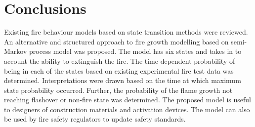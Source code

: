 \documentclass[12pt]{asme2ej}
\begin{document}
\section{Conclusions}
Existing fire behaviour models based on state transition methods were reviewed. An alternative and structured approach to fire growth modelling based on semi-Markov process model was proposed. The model has six states and takes in to account the ability to extinguish the fire.  The time dependent probability of being in each of the states based on existing experimental fire test data was determined. Interpretations were drawn based on the time at which maximum state probability occurred.  Further, the probability of the flame growth not reaching flashover or non-fire state was determined. The proposed model is useful to designers of construction materials and activation devices. The model can also be used by fire safety regulators to update safety standards.
%




\end{document}
